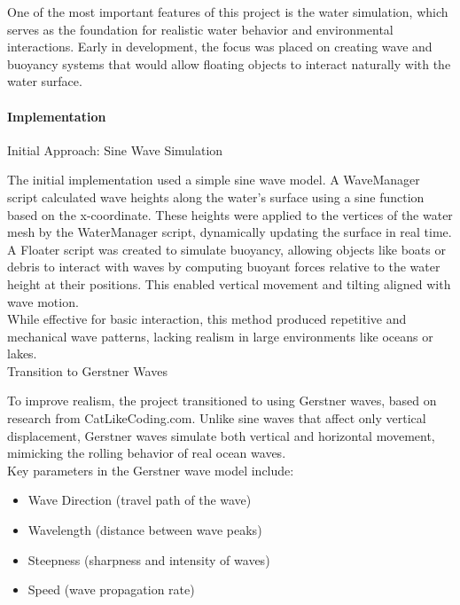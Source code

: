 \documentclass{article}
\begin{document}
One of the most important features of this project is the water simulation, which serves as the foundation for realistic water behavior and environmental interactions. Early in development, the focus was placed on creating wave and buoyancy systems that would allow floating objects to interact naturally with the water surface.

\paragraph{Implementation}\hfill

\noindent Initial Approach: Sine Wave Simulation

The initial implementation used a simple sine wave model. A WaveManager script calculated wave heights along the water's surface using a sine function based on the x-coordinate. These heights were applied to the vertices of the water mesh by the WaterManager script, dynamically updating the surface in real time.\\

A Floater script was created to simulate buoyancy, allowing objects like boats or debris to interact with waves by computing buoyant forces relative to the water height at their positions. This enabled vertical movement and tilting aligned with wave motion.\\

While effective for basic interaction, this method produced repetitive and mechanical wave patterns, lacking realism in large environments like oceans or lakes.\\

\noindent Transition to Gerstner Waves

To improve realism, the project transitioned to using Gerstner waves, based on research from CatLikeCoding.com. Unlike sine waves that affect only vertical displacement, Gerstner waves simulate both vertical and horizontal movement, mimicking the rolling behavior of real ocean waves.\\

Key parameters in the Gerstner wave model include:
\begin{itemize}
    \item Wave Direction (travel path of the wave)
    \item Wavelength (distance between wave peaks)
    \item Steepness (sharpness and intensity of waves)
    \item Speed (wave propagation rate)
\end{itemize}
\end{document}
